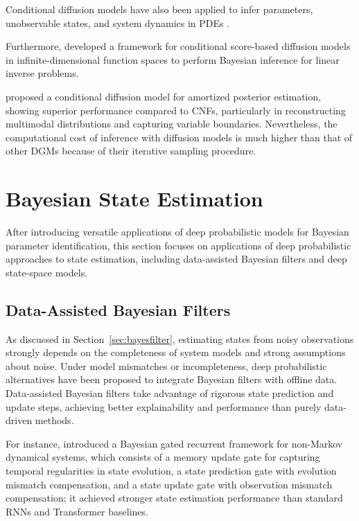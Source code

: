 Conditional diffusion models have also been applied to infer parameters, unobservable states, and system dynamics in \acp{PDE} \citep{haitsiukevich2024}. 

Furthermore, \citeauthor{baldassari2023} \citeyearpar{baldassari2023} developed a framework for conditional score-based diffusion models in infinite-dimensional function spaces to perform Bayesian inference for linear inverse problems. 

\citeauthor{chen2025conddiff} \citeyearpar{chen2025conddiff} proposed a conditional diffusion model for amortized posterior estimation, showing superior performance compared to \acp{CNF}, particularly in reconstructing multimodal distributions and capturing variable boundaries. 
Nevertheless, the computational cost of inference with diffusion models is much higher than that of other \acp{DGM} because of their iterative sampling procedure.

\section{Bayesian State Estimation}\label{sec:literature:state_estimation}
After introducing versatile applications of deep probabilistic models for Bayesian parameter identification, this section focuses on applications of deep probabilistic approaches to state estimation, including data-assisted Bayesian filters and deep state-space models. 

\subsection{Data-Assisted Bayesian Filters}\label{sec:literature:data_assisted_bayes_filter}
As discussed in Section~\ref{sec:bayesfilter}, estimating states from noisy observations strongly depends on the completeness of system models and strong assumptions about noise. Under model mismatches or incompleteness, deep probabilistic alternatives have been proposed to integrate Bayesian filters with offline data. Data-assisted Bayesian filters take advantage of rigorous state prediction and update steps, achieving better explainability and performance than purely data-driven methods.

For instance, \citeauthor{yan2024brnn} \citeyearpar{yan2024brnn} introduced a Bayesian gated recurrent framework for non-Markov dynamical systems, which consists of a memory update gate for capturing temporal regularities in state evolution, a state prediction gate with evolution mismatch compensation, and a state update gate with observation mismatch compensation; it achieved stronger state estimation performance than standard \acp{RNN} and Transformer baselines. 

